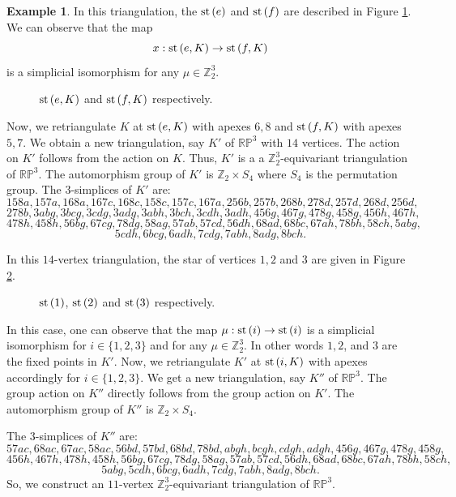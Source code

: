 \documentclass[11pt]{amsart}
\numberwithin{equation}{section}
\theoremstyle{definition}
\newtheorem{example}[theorem]{Example}
\newcommand{\st}{\mbox{\upshape st}\,}
\newcommand{\RP}{\mathbb{RP}}
\def \bb{\mathbb}
\def \ZZ{{\bb{Z}}}
\begin{document}
\begin{example}
In this triangulation, the $\st(e)$ and $\st(f)$ are described in Figure \ref{rpn7}. We can observe that the map %
$$ x : \st(e,K) \to \st(f,K)$$
is a simplicial isomorphism for any $\mu \in \ZZ_2^3$. 
\begin{figure}[ht]
\centerline{
\scalebox{.50}{

 }
 }
\caption {$\st(e,K)$ and $\st(f,K)$ respectively.}
\label{rpn7}
\end{figure}

Now, we retriangulate $K$ at $\st(e,K)$ with apexes $6,8$ and $\st(f,K)$ with apexes $5,7$. We obtain a new triangulation, say $K'$ of $\RP^3$ with $14$ vertices. The action on $K'$ follows from the action on $K$. Thus, $K'$ is a
a $\ZZ_2^3$-equivariant triangulation of $\RP^3$. The automorphism group of $K'$ is $\ZZ_2\times S_4$ where $S_4$ is the permutation group. 
The $3$-simplices of $K'$ are: 
$$158a, 157a, 168a, 167c, 168c, 158c, 157c, 167a, 256b, 257b, 268b, 278d,
257d, 268d, 256d,$$ 
$$278b, 3abg, 3bcg, 3cdg, 3adg, 3abh, 3bch, 3cdh, 3adh,
456g, 467g, 478g, 458g, 456h, 467h,$$ 
$$ 478h, 458h, 56bg, 67cg, 78dg, 58ag,
57ab, 57cd, 56dh, 68ad, 68bc, 67ah, 78bh, 58ch, 5abg,$$ 
$$5cdh, 6bcg, 6adh, 7cdg, 7abh, 8adg, 8bch.$$

In this $14$-vertex triangulation, the star of vertices $1, 2$ and $3$ are given in Figure \ref{rpn9}.
\begin{figure}[ht]
\centerline{
\scalebox{.50}{

 }
 }
\caption {$\st(1)$, $\st(2)$ and $\st(3)$ respectively.}
\label{rpn9}
\end{figure}
In this case, one can observe that the map
$\mu: \st(i) \to \st(i)$ is a simplicial isomorphism for $i \in \{1, 2, 3\}$ and for any $\mu\in \ZZ_2^3$. In other words $1,2$, and $3$ are the fixed points in $K'$. Now, we retriangulate $K'$ at $\st(i,K)$ with apexes accordingly for $i\in\{1, 2, 3\}$.  We get a new triangulation, say $K''$ of $\RP^3$. The group action on $K''$ directly follows from the group action on $K'$. The automorphism group of $K''$ is $\ZZ_2\times S_4$. 

The $3$-simplices of $K''$ are: 
$$57ac, 68ac, 67ac, 58ac, 56bd, 57bd, 68bd, 78bd, abgh, bcgh, cdgh, adgh,
456g, 467g, 478g, 458g, $$ 
$$456h, 467h, 478h, 458h, 56bg, 67cg, 78dg, 58ag, 57ab, 57cd, 56dh, 68ad, 68bc, 67ah, 78bh, 58ch,$$
$$5abg, 5cdh, 6bcg, 6adh, 7cdg, 7abh, 8adg, 8bch.$$
So, we construct an $11$-vertex $\ZZ_2^3$-equivariant triangulation of $\mathbb{RP}^3$.


\end{example}
\end{document}
